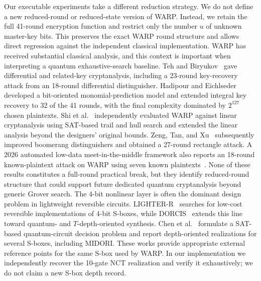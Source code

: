 \documentclass[pdflatex,sn-nature]{sn-jnl}
\theoremstyle{thmstyleone}
\theoremstyle{thmstyletwo}
\begin{document}
Our executable experiments take a different reduction strategy. We do not define a new reduced-round or reduced-state version of WARP. Instead, we retain the full 41-round encryption function and restrict only the number $u$ of unknown master-key bits. This preserves the exact WARP round structure and allows direct regression against the independent classical implementation.
WARP has received substantial classical analysis, and this context is important when interpreting a quantum exhaustive-search baseline. Teh and Biryukov~\cite{Teh2022} gave differential and related-key cryptanalysis, including a 23-round key-recovery attack from an 18-round differential distinguisher. Hadipour and Eichlseder~\cite{Hadipour2022} developed a bit-oriented monomial-prediction model and extended integral key recovery to 32 of the 41 rounds, with the final complexity dominated by $2^{127}$ chosen plaintexts. Shi et al.~\cite{Shi2023} independently evaluated WARP against linear cryptanalysis using SAT-based trail and hull search and extended the linear analysis beyond the designers' original bounds. Zeng, Tan, and Xu~\cite{Zeng2025} subsequently improved boomerang distinguishers and obtained a 27-round rectangle attack. A 2026 automated low-data meet-in-the-middle framework also reports an 18-round known-plaintext attack on WARP using seven known plaintexts~\cite{Vaziri2026}. None of these results constitutes a full-round practical break, but they identify reduced-round structure that could support future dedicated quantum cryptanalysis beyond generic Grover search.
The 4-bit nonlinear layer is often the dominant design problem in lightweight reversible circuits. LIGHTER-R~\cite{Dasu2019} searches for low-cost reversible implementations of 4-bit S-boxes, while DORCIS~\cite{DORCIS2023} extends this line toward quantum- and $T$-depth-oriented synthesis. Chen et al.~\cite{Chen2024} formulate a SAT-based quantum-circuit decision problem and report depth-oriented realizations for several S-boxes, including MIDORI. These works provide appropriate external reference points for the same S-box used by WARP. In our implementation we independently recover the 10-gate NCT realization and verify it exhaustively; we do not claim a new S-box depth record.
\end{document}
